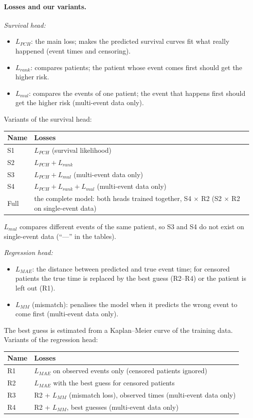\documentclass[11pt]{article}
\begin{document}
\paragraph{Losses and our variants.}
\emph{Survival head:}
\begin{itemize}
  \item $L_{PCH}$: the main loss; makes the predicted survival curves fit what really happened
        (event times and censoring).
  \item $L_{rank}$: compares patients; the patient whose event comes first should get the higher risk.
  \item $L_{mul}$: compares the events of one patient; the event that happens first should get the
        higher risk (multi-event data only).
\end{itemize}
Variants of the survival head:
\begin{center}
\begin{tabular}{ll}
\toprule
Name & Losses \\
\midrule
S1 & $L_{PCH}$ (survival likelihood) \\
S2 & $L_{PCH} + L_{rank}$ \\
S3 & $L_{PCH} + L_{mul}$ (multi-event data only) \\
S4 & $L_{PCH} + L_{rank} + L_{mul}$ (multi-event data only) \\
Full & the complete model: both heads trained together, S4 $\times$ R2 (S2 $\times$ R2 on single-event data) \\
\bottomrule
\end{tabular}
\end{center}
$L_{mul}$ compares different events of the same patient, so S3 and S4 do not exist on
single-event data (``---'' in the tables).

\emph{Regression head:}
\begin{itemize}
  \item $L_{MAE}$: the distance between predicted and true event time; for censored patients the true
        time is replaced by the best guess (R2--R4) or the patient is left out (R1).
  \item $L_{MM}$ (mismatch): penalises the model when it predicts the wrong event to come first
        (multi-event data only).
\end{itemize}
The best guess is estimated from a Kaplan--Meier curve of the training data.
Variants of the regression head:
\begin{center}
\begin{tabular}{ll}
\toprule
Name & Losses \\
\midrule
R1 & $L_{MAE}$ on observed events only (censored patients ignored) \\
R2 & $L_{MAE}$ with the best guess for censored patients \\
R3 & R2 + $L_{MM}$ (mismatch loss), observed times (multi-event data only) \\
R4 & R2 + $L_{MM}$, best guesses (multi-event data only) \\
\bottomrule
\end{tabular}
\end{center}
\end{document}
